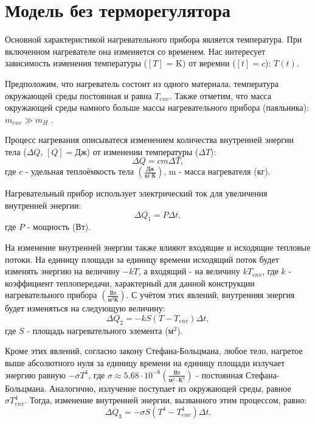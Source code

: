 \section{Модель без терморегулятора}
Основной характеристикой нагревательного прибора является температура. При включенном нагревателе она изменяется со временем. Нас интересует зависимость изменения температуры ($[T]$ = K) от веремни ($[t]=c$): $T(t)$.

Предположим, что нагреватель состоит из одного материала, температура окружающей среды постоянная и равна $T_{env}$. Также отметим, что масса окружающей среды намного больше массы нагревательного прибора (паяльника): $m_{env} \gg m_H$ .

Процесс нагревания описыватеся \cite{quant} изменением количества внутренней энергии тела ($\Delta Q$, $[Q]=\text{Дж}$)  от изменении температуры ($\Delta T$):
\begin{equation}
	\Delta Q = cm\Delta T,
	\label{eq:heat_energy}
\end{equation}
где $c$ - удельная теплоёмкость тела $\left(\frac{\text{Дж}}{\text{кг}\cdot\text{К}}\right)$, m - масса нагревателя (кг).

Нагревательный прибор использует электрический ток для увеличения внутренней энергии:
\begin{equation}
	\Delta Q_1 = P \Delta t,
	\label{eq:electrical_energy}
\end{equation}
где $P$ - мощность (Вт).

На изменение внутренней энергии также влияют входящие и исходящие тепловые потоки.
На единицу площади за единицу времени исходящий поток будет изменять энергию на величину $-kT$, 
а входящий - на величину $kT_{env}$, где $k$ - коэффициент теплопередачи, характерный для данной конструкции нагревательного прибора $\left(\frac{\text{Вт}}{\text{м}^2\text{К}}\right)$. С учётом этих явлений, внутренняя энергия будет изменяться на следующую величину:
\begin{equation}
	\Delta Q_2 = -kS(T-T_{env})\Delta t,
	\label{eq:heat_transfer}
\end{equation}
где $S$ - площадь нагревательного элемента (м$^2$).

Кроме этих явлений, согласно закону Стефана-Больцмана, любое тело, нагретое выше абсолютного нуля за единицу времени на единицу площади излучает энергию равную $-\sigma T^4$, где $\sigma \approx 5.68 \cdot 10 ^{-8} \left(\frac{\text{Вт}}{\text{м}^2\cdot\text{К}^4}\right) $ - постоянная Стефана-Больцмана. Аналогично, излучение поступает из окружающей среды, равное $\sigma T^4_{env}$.
Тогда, изменение внутренней энергии, вызванного этим процессом, равно:
\begin{equation}
	\Delta Q_3 = -\sigma S (T^4 - T^4_{env}) \Delta t.
	\label{eq:stefan_boltzmann}
\end{equation}


